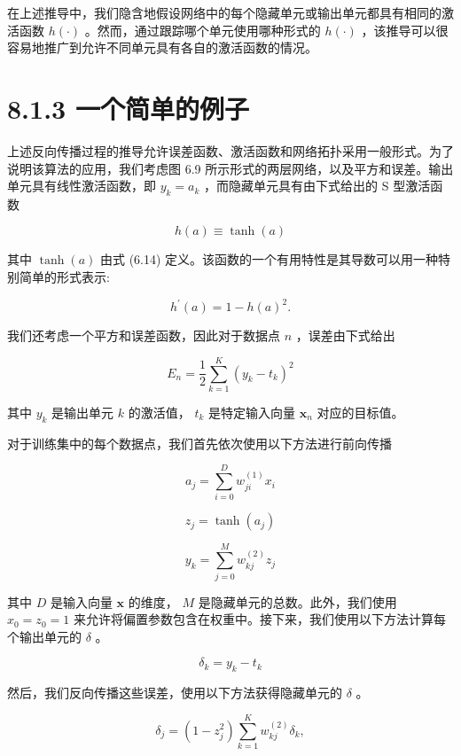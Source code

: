 \documentclass[10pt]{report}
\begin{document}
在上述推导中，我们隐含地假设网络中的每个隐藏单元或输出单元都具有相同的激活函数 \(h\left( \cdot \right)\) 。然而，通过跟踪哪个单元使用哪种形式的 \(h\left( \cdot \right)\) ，该推导可以很容易地推广到允许不同单元具有各自的激活函数的情况。

\section*{8.1.3 一个简单的例子}

上述反向传播过程的推导允许误差函数、激活函数和网络拓扑采用一般形式。为了说明该算法的应用，我们考虑图 6.9 所示形式的两层网络，以及平方和误差。输出单元具有线性激活函数，即 \({y}_{k} = {a}_{k}\) ，而隐藏单元具有由下式给出的 S 型激活函数

\[
h\left( a\right)  \equiv  \tanh \left( a\right)  \tag{8.15}
\]

其中 \(\tanh \left( a\right)\) 由式 (6.14) 定义。该函数的一个有用特性是其导数可以用一种特别简单的形式表示:

\[
{h}^{\prime }\left( a\right)  = 1 - h{\left( a\right) }^{2}. \tag{8.16}
\]

我们还考虑一个平方和误差函数，因此对于数据点 \(n\) ，误差由下式给出

\[
{E}_{n} = \frac{1}{2}\mathop{\sum }\limits_{{k = 1}}^{K}{\left( {y}_{k} - {t}_{k}\right) }^{2} \tag{8.17}
\]

其中 \({y}_{k}\) 是输出单元 \(k\) 的激活值， \({t}_{k}\) 是特定输入向量 \({\mathbf{x}}_{n}\) 对应的目标值。

对于训练集中的每个数据点，我们首先依次使用以下方法进行前向传播

\[
{a}_{j} = \mathop{\sum }\limits_{{i = 0}}^{D}{w}_{ji}^{\left( 1\right) }{x}_{i} \tag{8.18}
\]

\[
{z}_{j} = \tanh \left( {a}_{j}\right)  \tag{8.19}
\]

\[
{y}_{k} = \mathop{\sum }\limits_{{j = 0}}^{M}{w}_{kj}^{\left( 2\right) }{z}_{j} \tag{8.20}
\]

其中 \(D\) 是输入向量 \(\mathbf{x}\) 的维度， \(M\) 是隐藏单元的总数。此外，我们使用 \({x}_{0} = {z}_{0} = 1\) 来允许将偏置参数包含在权重中。接下来，我们使用以下方法计算每个输出单元的 \(\delta\) 。

\[
{\delta }_{k} = {y}_{k} - {t}_{k} \tag{8.21}
\]

然后，我们反向传播这些误差，使用以下方法获得隐藏单元的 \(\delta\) 。

\[
{\delta }_{j} = \left( {1 - {z}_{j}^{2}}\right) \mathop{\sum }\limits_{{k = 1}}^{K}{w}_{kj}^{\left( 2\right) }{\delta }_{k}, \tag{8.22}
\]
\end{document}
